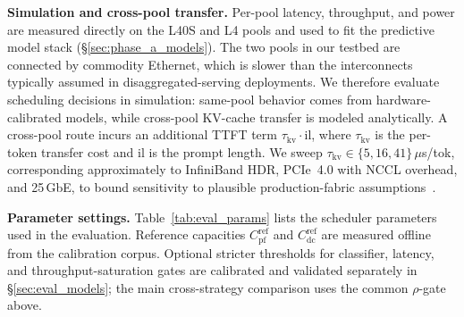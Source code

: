 \textbf{Simulation and cross-pool transfer.}
Per-pool latency, throughput, and power are measured directly on the L40S and L4 pools and used to fit the predictive model stack (\S\ref{sec:phase_a_models}).
The two pools in our testbed are connected by commodity Ethernet, which is slower than the interconnects typically assumed in disaggregated-serving deployments.
We therefore evaluate scheduling decisions in simulation: same-pool behavior comes from hardware-calibrated models, while cross-pool KV-cache transfer is modeled analytically.
A cross-pool route incurs an additional TTFT term $\tau_{\mathrm{kv}}\cdot \mathrm{il}$, where $\tau_{\mathrm{kv}}$ is the per-token transfer cost and $\mathrm{il}$ is the prompt length.
We sweep $\tau_{\mathrm{kv}}\in\{5,16,41\}\,\mu$s/tok, corresponding approximately to InfiniBand HDR, PCIe~4.0 with NCCL overhead, and 25\,GbE, to bound sensitivity to plausible production-fabric assumptions~\cite{patel2024splitwise,zhong2024distserve}.

\textbf{Parameter settings.}
Table~\ref{tab:eval_params} lists the scheduler parameters used in the evaluation.
Reference capacities $C_{\mathrm{pf}}^{\mathrm{ref}}$ and $C_{\mathrm{dc}}^{\mathrm{ref}}$ are measured offline from the calibration corpus.
Optional stricter thresholds for classifier, latency, and throughput-saturation gates are calibrated and validated separately in \S\ref{sec:eval_models}; the main cross-strategy comparison uses the common $\rho$-gate above.

